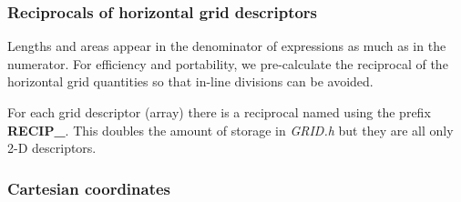 \subsubsection{Reciprocals of horizontal grid descriptors}

Lengths and areas appear in the denominator of expressions as much as
in the numerator. For efficiency and portability, we pre-calculate the
reciprocal of the horizontal grid quantities so that in-line divisions
can be avoided.

For each grid descriptor (array) there is a reciprocal named using the
prefix {\bf RECIP\_}. This doubles the amount of storage in {\em
GRID.h} but they are all only 2-D descriptors.


\subsubsection{Cartesian coordinates}

